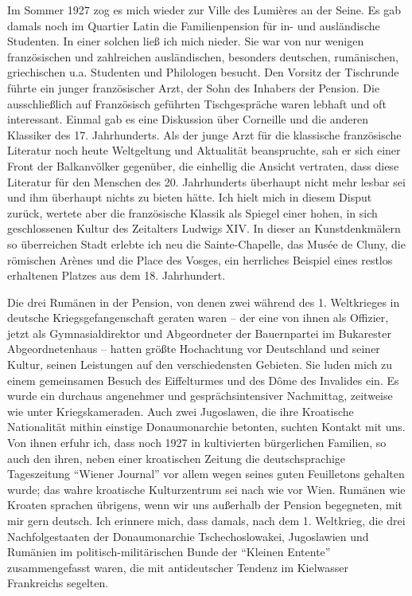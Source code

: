 \documentclass[a5paper,pagesize,10pt,twoside=true]{scrbook}
\begin{document}
Im Sommer 1927 zog es mich wieder zur Ville des Lumières an der Seine. Es gab damals noch im Quartier Latin die Familienpension für in- und ausländische Studenten. In einer solchen ließ ich mich nieder. Sie war von nur wenigen französischen und zahlreichen ausländischen, besonders deutschen, rumänischen, griechischen u.a. Studenten und Philologen besucht. Den Vorsitz der Tischrunde führte ein junger französischer Arzt, der Sohn des Inhabers der Pension. Die ausschließlich auf Französisch geführten Tischgespräche waren lebhaft und oft interessant. Einmal gab es eine Diskussion über Corneille und die anderen Klassiker des 17. Jahrhunderts. Als der junge Arzt für die klassische französische Literatur noch heute Weltgeltung und Aktualität beanspruchte, sah er sich einer Front der Balkanvölker gegenüber, die einhellig die Ansicht vertraten, dass diese Literatur für den Menschen des 20. Jahrhunderts überhaupt nicht mehr lesbar sei und ihm überhaupt nichts zu bieten hätte. Ich hielt mich in diesem Disput zurück, wertete aber die französische Klassik als Spiegel einer hohen, in sich geschlossenen Kultur des Zeitalters Ludwigs XIV. In dieser an Kunstdenkmälern so überreichen Stadt erlebte ich neu die Sainte-Chapelle, das Musée de Cluny, die römischen Arènes und die Place des Vosges, ein herrliches Beispiel eines restlos erhaltenen Platzes aus dem 18. Jahrhundert.

Die drei Rumänen in der Pension, von denen zwei während des 1. Weltkrieges in deutsche Kriegsgefangenschaft geraten waren -- der eine von ihnen als Offizier, jetzt als Gymnasialdirektor und Abgeordneter der Bauernpartei im Bukarester Abgeordnetenhaus -- hatten größte Hochachtung vor Deutschland und seiner Kultur, seinen Leistungen auf den verschiedensten Gebieten. Sie luden mich zu einem gemeinsamen Besuch des Eiffelturmes und des Dôme des Invalides ein. Es wurde ein durchaus angenehmer und gesprächsintensiver Nachmittag, zeitweise wie unter Kriegskameraden. Auch zwei Jugoslawen, die ihre Kroatische Nationalität mithin einstige Donaumonarchie betonten, suchten Kontakt mit uns. Von ihnen erfuhr ich, dass noch 1927 in kultivierten bürgerlichen Familien, so auch den ihren, neben einer kroatischen Zeitung die deutschsprachige Tageszeitung \enquote{Wiener Journal} vor allem wegen seines guten Feuilletons gehalten wurde; das wahre kroatische Kulturzentrum sei nach wie vor Wien. Rumänen wie Kroaten sprachen übrigens, wenn wir uns außerhalb der Pension begegneten, mit mir gern deutsch. Ich erinnere mich, dass damals, nach dem 1. Weltkrieg, die drei Nachfolgestaaten der Donaumonarchie Tschechoslowakei, Jugoslawien und Rumänien im politisch-militärischen Bunde der \enquote{Kleinen Entente} zusammengefasst waren, die mit antideutscher Tendenz im Kielwasser Frankreichs segelten.
\end{document}
